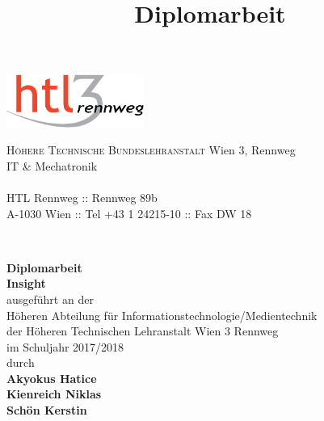 \documentclass[
    headings=optiontotocandhead,%
    twoside,
    numbers=noenddot,%
    toc=flat, %
    12pt, %
    titlepage, %
    parskip=full, %
    listof=totoc, %
    listof=flat, %
    numbers=noenddot, %
    bibliography=totoc, %
    a4paper,DIV=14,
    BCOR=15mm,
]{scrbook}
\begin{document}
\newcommand{\kapitelautor}{}


\frontmatter %
\title{Diplomarbeit}
\begin{titlepage}
\begin{minipage}[b]{1\columnwidth}
\parbox[b]{50mm}{\includegraphics[width=45mm]{HTL3RLogoRGB}}
\hfill
\parbox[b]{130mm}{\footnotesize \textsc{Höhere Technische Bundeslehranstalt} Wien 3, Rennweg\\
IT \& Mechatronik\\
\\
HTL Rennweg :: Rennweg 89b\\
A-1030 Wien :: Tel +43 1 24215-10 :: Fax DW 18
}\\
\mbox{}
\end{minipage}

\vspace{1cm}


\begin{center}
\textbf{\LARGE{}Diplomarbeit}{\large{}}\\
\textbf{\large{}Insight}\\
 \vspace{15mm}
 ausgeführt an der\\
 Höheren Abteilung für Informationstechnologie/Medientechnik\\
 der Höheren Technischen Lehranstalt Wien 3 Rennweg\\
 \vspace{1cm}
 im Schuljahr 2017/2018\\
 \vspace{1cm}
 durch\\
 \vspace{0.5cm}
\textbf{\large{}Akyokus Hatice}\\
\textbf{\large{}Kienreich Niklas}\\
\textbf{\large{}Schön Kerstin}\\

\par\end{center}{\large \par}


\end{titlepage}
\end{document}
